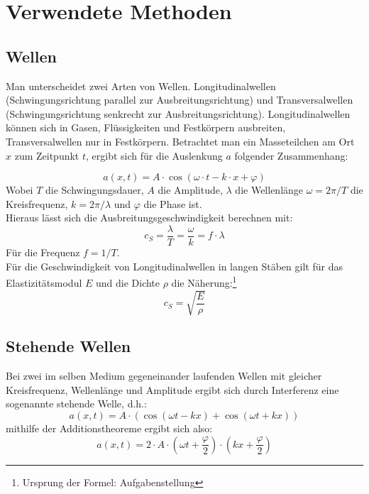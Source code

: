 \section{Verwendete Methoden}
\subsection{Wellen}
Man unterscheidet zwei Arten von Wellen. Longitudinalwellen (Schwingungsrichtung parallel zur Ausbreitungsrichtung) und Transversalwellen (Schwingungsrichtung senkrecht zur Ausbreitungsrichtung). Longitudinalwellen können sich in Gasen, Flüssigkeiten und Festkörpern ausbreiten, Transversalwellen nur in Festkörpern. Betrachtet man ein Masseteilchen am Ort $x$ zum Zeitpunkt $t$, ergibt sich für die Auslenkung $a$ folgender Zusammenhang:

\begin{equation}
a(x, t) = A \cdot \cos (\omega \cdot t - k \cdot x + \varphi)
\label{eq.wave}
\end{equation}
Wobei $T$ die Schwingungsdauer, $A$ die Amplitude, $\lambda$ die Wellenlänge $\omega = 2\pi /T$ die Kreisfrequenz, $k = 2\pi /\lambda$ und $\varphi$ die Phase ist.\\
Hieraus lässt sich die Ausbreitungsgeschwindigkeit berechnen mit:
\begin{equation}
c_S = \frac{\lambda}{T} = \frac{\omega}{k} = f \cdot \lambda
\label{eq:speed}
\end{equation}
Für die Frequenz $f = 1/T$.\\
Für die Geschwindigkeit von Longitudinalwellen in langen Stäben gilt für das Elastizitätsmodul $E$ und die Dichte $\rho$ die Näherung:\footnote{Ursprung der Formel: Aufgabenstellung}
\begin{equation}
c_S = \sqrt{\frac{E}{\rho}}
\label{eq:elast}
\end{equation}
\subsection{Stehende Wellen}
Bei zwei im selben Medium gegeneinander laufenden Wellen mit gleicher Kreisfrequenz, Wellenlänge und Amplitude ergibt sich durch Interferenz eine sogenannte stehende Welle, d.h.:
\begin{equation*}
a(x, t) = A \cdot (\cos (\omega t - kx) + \cos (\omega t + kx))
\end{equation*}
mithilfe der Additionstheoreme ergibt sich also:
\begin{equation}
a(x, t) = 2 \cdot A \cdot \left(\omega t + \frac{\varphi}{2}\right)\cdot\left(kx + \frac{\varphi}{2}\right)
\label{eq:standingWave}
\end{equation}






